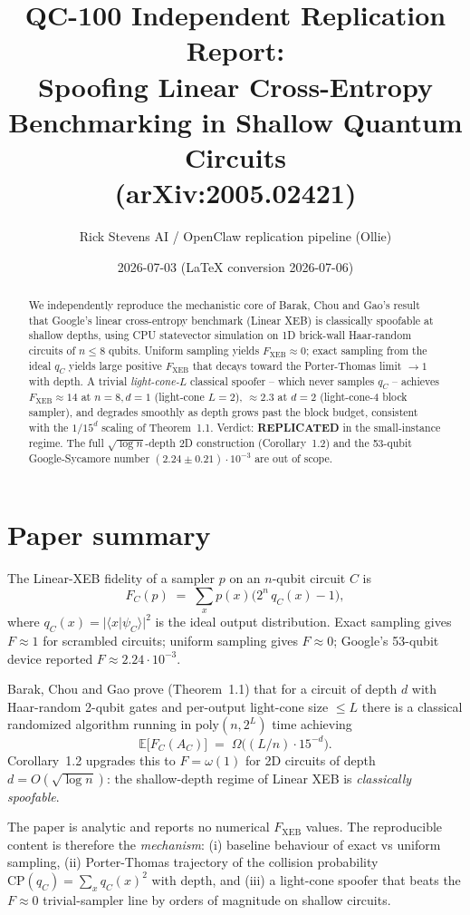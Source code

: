 \documentclass[11pt]{article}
\title{QC-100 Independent Replication Report:\\
Spoofing Linear Cross-Entropy Benchmarking in Shallow Quantum Circuits\\
(arXiv:2005.02421)}
\author{Rick Stevens AI / OpenClaw replication pipeline (Ollie)}
\date{2026-07-03 (LaTeX conversion 2026-07-06)}
\begin{document}
\maketitle

\begin{abstract}
We independently reproduce the mechanistic core of Barak, Chou and Gao's
result that Google's linear cross-entropy benchmark (Linear XEB) is
classically spoofable at shallow depths, using CPU statevector
simulation on 1D brick-wall Haar-random circuits of $n\le 8$ qubits.
Uniform sampling yields $F_{\mathrm{XEB}}\approx 0$; exact sampling from
the ideal $q_C$ yields large positive $F_{\mathrm{XEB}}$ that decays
toward the Porter-Thomas limit $\to 1$ with depth. A trivial
\emph{light-cone-$L$} classical spoofer -- which never samples $q_C$ --
achieves $F_{\mathrm{XEB}}\approx 14$ at $n{=}8, d{=}1$ (light-cone
$L{=}2$), $\approx 2.3$ at $d{=}2$ (light-cone-4 block sampler), and
degrades smoothly as depth grows past the block budget, consistent with
the $1/15^d$ scaling of Theorem~1.1. Verdict: \textbf{REPLICATED} in the
small-instance regime. The full $\sqrt{\log n}$-depth 2D construction
(Corollary~1.2) and the 53-qubit Google-Sycamore number
$(2.24\pm 0.21)\cdot 10^{-3}$ are out of scope.
\end{abstract}

\section{Paper summary}

The Linear-XEB fidelity of a sampler $p$ on an $n$-qubit circuit $C$ is
\[
F_C(p)\;=\;\sum_x p(x)\bigl(2^n\,q_C(x) - 1\bigr),
\]
where $q_C(x) = |\langle x | \psi_C\rangle|^2$ is the ideal output
distribution. Exact sampling gives $F\approx 1$ for scrambled circuits;
uniform sampling gives $F\approx 0$; Google's 53-qubit device reported
$F\approx 2.24\cdot 10^{-3}$.

Barak, Chou and Gao prove (Theorem~1.1) that for a circuit of depth $d$
with Haar-random 2-qubit gates and per-output light-cone size $\le L$
there is a classical randomized algorithm running in $\mathrm{poly}(n,
2^L)$ time achieving
\[
\mathbb{E}\bigl[F_C(A_C)\bigr] \;=\; \Omega\bigl((L/n)\cdot 15^{-d}\bigr).
\]
Corollary~1.2 upgrades this to $F=\omega(1)$ for 2D circuits of depth
$d=O(\sqrt{\log n})$: the shallow-depth regime of Linear XEB is
\emph{classically spoofable}.

The paper is analytic and reports no numerical $F_{\mathrm{XEB}}$
values. The reproducible content is therefore the \emph{mechanism}:
(i) baseline behaviour of exact vs uniform sampling, (ii) Porter-Thomas
trajectory of the collision probability $\mathrm{CP}(q_C) = \sum_x
q_C(x)^2$ with depth, and (iii) a light-cone spoofer that beats the
$F\approx 0$ trivial-sampler line by orders of magnitude on shallow
circuits.
\end{document}
